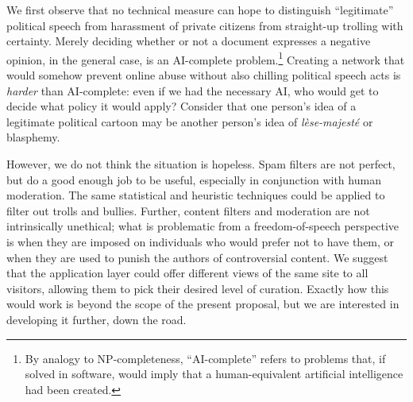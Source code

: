 \documentclass{zarticle}
\begin{document}
We first observe that no technical measure can hope to distinguish
“legitimate” political speech from harassment of private citizens from
straight-up trolling with certainty.  Merely deciding whether or not a
document expresses a negative opinion, in the general case, is an
AI-complete problem.\footnote{By analogy to NP-completeness,
  “AI-complete” refers to problems that, if solved in software, would
  imply that a human-equivalent artificial intelligence had been
  created.}  Creating a network that would somehow prevent online
abuse without also chilling political speech acts is \emph{harder}
than AI-complete: even if we had the necessary AI, who would get to
decide what policy it would apply?  Consider that one person's idea of
a legitimate political cartoon may be another person's idea of
\textit{lèse-majesté} or blasphemy.

However, we do not think the situation is hopeless.  Spam filters are
not perfect, but do a good enough job to be useful, especially in
conjunction with human moderation.  The same statistical and heuristic
techniques could be applied to filter out trolls and bullies.
Further, content filters and moderation are not intrinsically
unethical; what is problematic from a freedom-of-speech perspective is
when they are imposed on individuals who would prefer not to have
them, or when they are used to punish the authors of controversial
content.  We suggest that the application layer could offer different
views of the same site to all visitors, allowing them to pick their
desired level of curation.  Exactly how this would work is beyond the
scope of the present proposal, but we are interested in developing it
further, down the road.

\printbibliography
\end{document}
